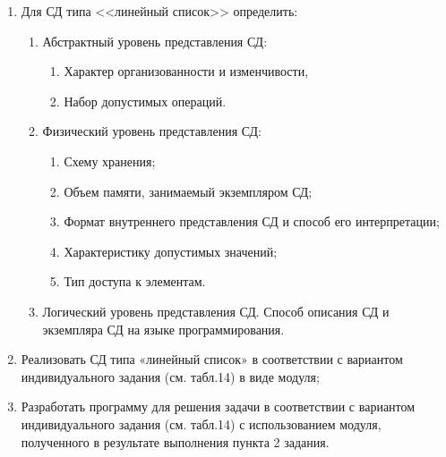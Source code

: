 \documentclass[12pt]{article}
\begin{document}
	\begin{enumerate}
	
	\item Для СД типа <<линейный список>> определить:
	
		\begin{enumerate}
	
			\item Абстрактный уровень представления СД:
			
			\begin{enumerate}
	
				\item Характер организованности и изменчивости, 
	
				\item Набор допустимых операций.
			
			\end{enumerate}
	
	
			\item Физический уровень представления СД:
			
			\begin{enumerate}
	
				\item Схему хранения;
	
				\item Объем памяти, занимаемый экземпляром СД;
	
				\item Формат внутреннего представления СД и способ его  интерпретации;
				
				\item Характеристику допустимых значений;
				
				\item Тип доступа к элементам.
				
			\end{enumerate}
			
			\item Логический уровень представления СД. Способ описания СД и экземпляра СД на языке программирования.
	
		\end{enumerate}
	
	\item Реализовать СД типа «линейный список» в соответствии с вариантом индивидуального задания (см. табл.14) в виде модуля;
	
	\item Разработать программу для решения задачи в соответствии с вариантом индивидуального задания (см. табл.14) с использованием модуля, полученного в результате выполнения пункта 2 задания.
	
	\end{enumerate}
	
\end{document}
